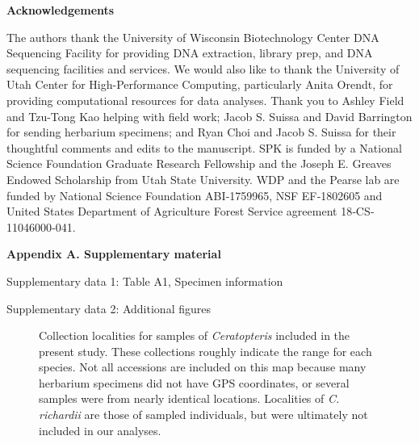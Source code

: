 \documentclass[12pt]{article}
\begin{document}
\begin{flushleft}
\vspace{1cm}

{\large\textbf{Acknowledgements}}

The authors thank the University of Wisconsin Biotechnology Center DNA Sequencing Facility for providing DNA extraction, library prep, and DNA sequencing facilities and services. We would also like to thank the University of Utah Center for High-Performance Computing, particularly Anita Orendt, for providing computational resources for data analyses. Thank you to Ashley Field and Tzu-Tong Kao helping with field work; Jacob S. Suissa and David Barrington for sending herbarium specimens; and Ryan Choi and Jacob S. Suissa for their thoughtful comments and edits to the manuscript. SPK is funded by a National Science Foundation Graduate Research Fellowship and the Joseph E. Greaves Endowed Scholarship from Utah State University. WDP and the Pearse lab are funded by National Science Foundation ABI‐1759965, NSF EF‐1802605 and United States Department of Agriculture Forest Service agreement 18‐CS‐11046000‐041.

\vspace{1cm}

{\large\textbf{Appendix A. Supplementary material}}

Supplementary data 1: Table A1, Specimen information

Supplementary data 2: Additional figures

\end{flushleft}
\vspace{30cm}

\begin{figure}[H]
\centering
\caption{Collection localities for samples of \textit{Ceratopteris} included in the present study. These collections roughly indicate the range for each species. Not all accessions are included on this map because many herbarium specimens did not have GPS coordinates, or several samples were from nearly identical locations. Localities of \textit{C. richardii} are those of sampled individuals, but were ultimately not included in our analyses.}
\label{map}
\end{figure}
\end{document}
